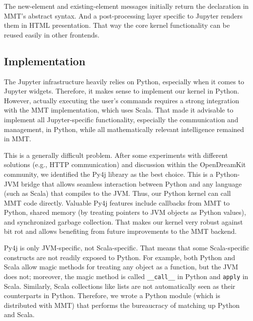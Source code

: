 The new-element and existing-element messages initially return the declaration in MMT's abstract syntax.
And a post-processing layer specific to Jupyter renders them in HTML presentation.
That way the core kernel functionality can be reused easily in other frontends.

\subsection{Implementation}\label{sec:kernel:impl}

The Jupyter infrastructure heavily relies on Python, especially when it comes to Jupyter widgets.
Therefore, it makes sense to implement our kernel in Python.
However, actually executing the user's commands requires a strong integration with the MMT implementation, which uses Scala.
That made it advisable to implement all Jupyter-specific functionality, especially the communication and management, in Python, while all mathematically relevant intelligence remained in MMT.

This is a generally difficult problem.
After some experiments with different solutions (e.g., HTTP communication) and discussion within the OpenDreamKit community, we identified the Py4j library as the best choice.
This is a Python-JVM bridge that allows seamless interaction between Python and any language (such as Scala) that compiles to the JVM.
Thus, our Python kernel can call MMT code directly.
Valuable Py4j features include callbacks from MMT to Python, shared memory (by treating pointers to JVM objects as Python values), and synchronized garbage collection.
That makes our kernel very robust against bit rot and allows benefiting from future improvements to the MMT backend.

Py4j is only JVM-specific, not Scala-specific.
That means that some Scala-specific constructs are not readily exposed to Python.
For example, both Python and Scala allow magic methods for treating any object as a function, but the JVM does not; moreover, the magic method is called \texttt{\_\_call\_\_} in Python and \texttt{apply} in Scala.
Similarly, Scala collections like lists are not automatically seen as their counterparts in Python.
Therefore, we wrote a Python module (which is distributed with MMT) that performs the bureaucracy of matching up Python and Scala.



